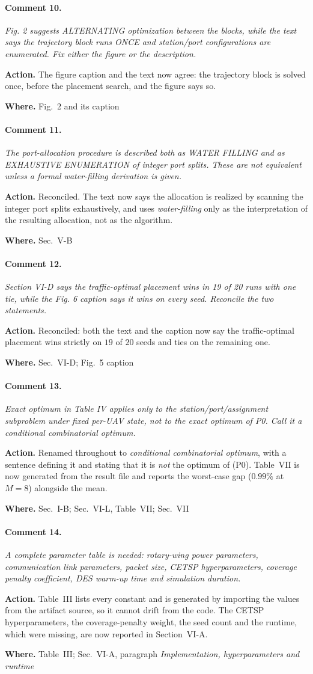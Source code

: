 \documentclass[10pt]{article}
\newcommand{\rev}[1]{\par\medskip\noindent\textit{#1}\par\smallskip}
\newcommand{\act}[2]{\noindent\textbf{Action.} #1\par\noindent\textbf{Where.} #2\par}
\begin{document}
\paragraph{Comment 10.}
\rev{Fig. 2 suggests ALTERNATING optimization between the blocks, while the text says the trajectory block runs ONCE and station/port configurations are enumerated. Fix either the figure or the description.}
\act{The figure caption and the text now agree: the trajectory block is solved once, before the placement search, and the figure says so.}{Fig.~2 and its caption}

\paragraph{Comment 11.}
\rev{The port-allocation procedure is described both as WATER FILLING and as EXHAUSTIVE ENUMERATION of integer port splits. These are not equivalent unless a formal water-filling derivation is given.}
\act{Reconciled. The text now says the allocation is realized by scanning the integer port splits exhaustively, and uses \emph{water-filling} only as the interpretation of the resulting allocation, not as the algorithm.}{Sec.~V-B}

\paragraph{Comment 12.}
\rev{Section VI-D says the traffic-optimal placement wins in 19 of 20 runs with one tie, while the Fig. 6 caption says it wins on every seed. Reconcile the two statements.}
\act{Reconciled: both the text and the caption now say the traffic-optimal placement wins strictly on $19$ of $20$ seeds and ties on the remaining one.}{Sec.~VI-D; Fig.~5 caption}

\paragraph{Comment 13.}
\rev{Exact optimum in Table IV applies only to the station/port/assignment subproblem under fixed per-UAV state, not to the exact optimum of P0. Call it a conditional combinatorial optimum.}
\act{Renamed throughout to \emph{conditional combinatorial optimum}, with a sentence defining it and stating that it is \emph{not} the optimum of (P0). Table~VII is now generated from the result file and reports the worst-case gap ($0.99\%$ at $M{=}8$) alongside the mean.}{Sec.~I-B; Sec.~VI-L, Table~VII; Sec.~VII}

\paragraph{Comment 14.}
\rev{A complete parameter table is needed: rotary-wing power parameters, communication link parameters, packet size, CETSP hyperparameters, coverage penalty coefficient, DES warm-up time and simulation duration.}
\act{Table~III lists every constant and is generated by importing the values from the artifact source, so it cannot drift from the code. The CETSP hyperparameters, the coverage-penalty weight, the seed count and the runtime, which were missing, are now reported in Section~VI-A.}{Table~III; Sec.~VI-A, paragraph \emph{Implementation, hyperparameters and runtime}}
\end{document}
